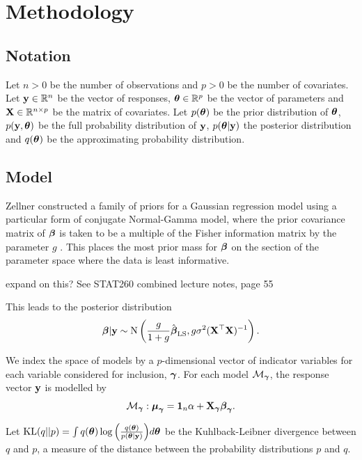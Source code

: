 \documentclass{amsart}[12pt]
\newcommand{\mgc}[1]{{\color{blue}#1}}
\begin{document}
\section{Methodology}
\label{sec:methodology}

\subsection{Notation}


Let $n > 0$ be the number of observations and $p > 0$ be the number of covariates. Let ${\bf y} \in {\mathbb{R}}^n$ be the
vector of responses, ${\boldsymbol \theta} \in {\mathbb{R}}^p$ be the vector of parameters and ${\bf X} \in {\mathbb{R}}^{n \times p}$ be the
matrix of covariates. Let $p({\boldsymbol \theta})$ be the prior distribution of ${\boldsymbol \theta}$, $p({\bf y}, {\boldsymbol \theta})$ be the full
probability distribution of ${\bf y}$, $p({\boldsymbol \theta} | {\bf y})$ the posterior distribution and $q({\boldsymbol \theta})$ be the
approximating probability distribution.

\subsection{Model}

Zellner constructed a family of priors for a Gaussian regression model using a particular form of conjugate
Normal-Gamma model, where the prior covariance matrix of ${\boldsymbol \beta}$ is taken to be a multiple of the Fisher
information  matrix by the parameter $g$ \cite{Goel1986}. This places the most prior mass for ${\boldsymbol \beta}$ on the
section of the parameter space where the data is least informative.

\mgc{expand on this? See STAT260 combined lecture notes, page 55}

This leads to the posterior distribution
\[
	{\boldsymbol \beta} | {\bf y} \sim \text{N}\left(\frac{g}{1+g} \hat{{\boldsymbol \beta}}_{\text{LS}}, g \sigma^2 ({\bf X}^\top {\bf X})^{-1} \right).
\]

We index the space of models by a $p$-dimensional vector of indicator variables for each variable considered 
for inclusion, ${\boldsymbol \gamma}$. For each model $\mathcal{M}_{\boldsymbol \gamma}$, the response vector ${\bf y}$ is modelled by
\begin{equation*}
	\mathcal{M}_{\boldsymbol \gamma}: {\boldsymbol \mu}_{\boldsymbol \gamma} = {\bf 1}_n \alpha + {\bf X}_{\boldsymbol \gamma} {\boldsymbol \beta}_{\boldsymbol \gamma}.
\end{equation*}

Let $\text{KL}(q||p) = \int q({\boldsymbol \theta}) \log{\left( \frac{q({\boldsymbol\theta})}{p({\boldsymbol\theta}|{\bf y})} \right)} d {\boldsymbol \theta}$ be the
Kuhlback-Leibner divergence between $q$ and $p$, a measure of the distance between the probability
distributions $p$ and $q$.
\end{document}
